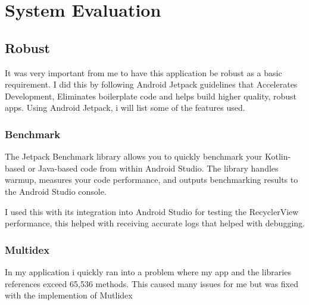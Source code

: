 \chapter{System Evaluation}

\section{Robust}
It was very important from me to have this application be robust as a basic requirement. I did this by following Android Jetpack\cite{android_jetpack} guidelines that Accelerates Development, Eliminates boilerplate code and helps build higher quality, robust apps.
Using Android Jetpack, i will list some of the features used.

\subsection{Benchmark}
The Jetpack Benchmark library allows you to quickly benchmark your Kotlin-based or Java-based code from within Android Studio. The library handles warmup, measures your code performance, and outputs benchmarking results to the Android Studio console.\newline

I used this with its integration into Android Studio for testing the RecyclerView performance, this helped with receiving accurate logs that helped with debugging.

\subsection{Multidex}
In my application i quickly ran into a problem where my app and the libraries references exceed 65,536 methods. This caused many issues for me but was fixed with the implemention of Mutlidex

